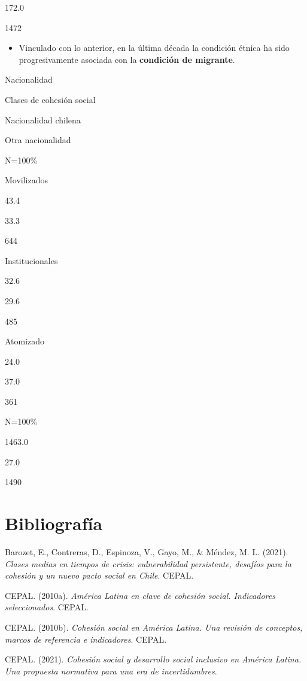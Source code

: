 \documentclass[
  12pt,
]{book}
\providecommand{\tightlist}{%
  \setlength{\itemsep}{0pt}\setlength{\parskip}{0pt}}
\begin{document}
172.0

1472

\begin{itemize}
\tightlist
\item
  Vinculado con lo anterior, en la última década la condición étnica ha sido progresivamente asociada con la \textbf{condición de migrante}.
\end{itemize}

Nacionalidad

Clases de cohesión social

Nacionalidad chilena

Otra nacionalidad

N=100\%

Movilizados

43.4

33.3

644

Institucionales

32.6

29.6

485

Atomizado

24.0

37.0

361

N=100\%

1463.0

27.0

1490

\hypertarget{bibliografuxeda}{%
\chapter*{Bibliografía}\label{bibliografuxeda}}

\hypertarget{refs}{}
\leavevmode\hypertarget{ref-barozet_clases_2021}{}%
Barozet, E., Contreras, D., Espinoza, V., Gayo, M., \& Méndez, M. L. (2021). \emph{Clases medias en tiempos de crisis: vulnerabilidad persistente, desafíos para la cohesión y un nuevo pacto social en Chile}. CEPAL.

\leavevmode\hypertarget{ref-cepal_america_2010}{}%
CEPAL. (2010a). \emph{América Latina en clave de cohesión social. Indicadores seleccionados}. CEPAL.

\leavevmode\hypertarget{ref-cepal_cohesion_2010}{}%
CEPAL. (2010b). \emph{Cohesión social en América Latina. Una revisión de conceptos, marcos de referencia e indicadores}. CEPAL.

\leavevmode\hypertarget{ref-cepal_cohesion_2021}{}%
CEPAL. (2021). \emph{Cohesión social y desarrollo social inclusivo en América Latina. Una propuesta normativa para una era de incertidumbres}.
\end{document}
